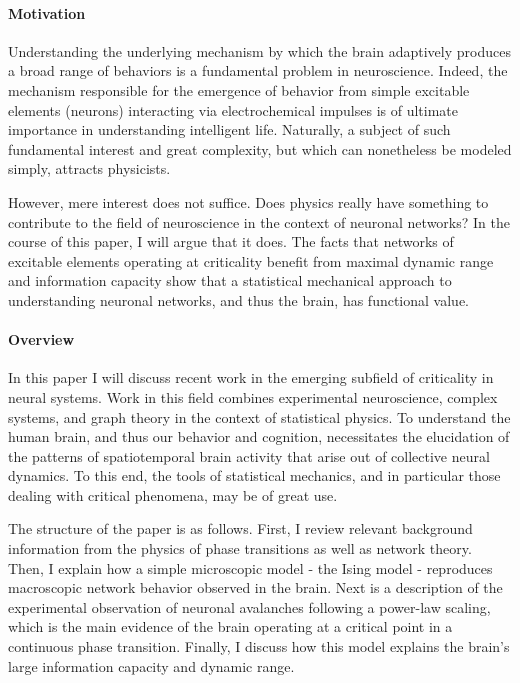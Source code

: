 \documentclass[12pt]{article}
\begin{document}
\paragraph*{Motivation} Understanding the underlying mechanism by which the brain adaptively produces a broad range of behaviors is a fundamental problem in neuroscience. Indeed, the mechanism responsible for the emergence of behavior from simple excitable elements (neurons) interacting via electrochemical impulses is of ultimate importance in understanding intelligent life. Naturally, a subject of such fundamental interest and great complexity, but which can nonetheless be modeled simply, attracts physicists. 

However, mere interest does not suffice. Does physics really have something to contribute to the field of neuroscience in the context of neuronal networks? In the course of this paper, I will argue that it does. The facts that networks of excitable elements operating at criticality benefit from maximal dynamic range \cite{Kinouchi2006b,Shew2009b} and information capacity\cite{Shew2011a} show that a statistical mechanical approach to understanding neuronal networks, and thus the brain, has functional value.

\paragraph*{Overview} In this paper I will discuss recent work in the emerging subfield of criticality in neural systems. Work in this field combines experimental neuroscience, complex systems, and graph theory in the context of statistical physics. To understand the human brain, and thus our behavior and cognition, necessitates the elucidation of the patterns of spatiotemporal brain activity that arise out of collective neural dynamics. To this end, the tools of statistical mechanics, and in particular those dealing with critical phenomena, may be of great use.

The structure of the paper is as follows. First, I review relevant background information from the physics of phase transitions as well as network theory. Then, I explain how a simple microscopic model - the Ising model - reproduces macroscopic network behavior observed in the brain. Next is a description of the experimental observation of neuronal avalanches following a power-law scaling, which is the main evidence of the brain operating at a critical point in a continuous phase transition. Finally, I discuss how this model explains the brain's large information capacity and dynamic range.
\end{document}
